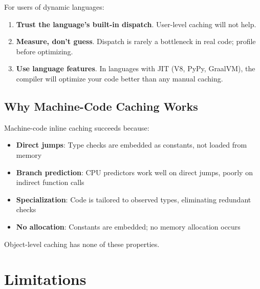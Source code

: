 \documentclass[sigplan,final]{acmart}
\begin{document}
For users of dynamic languages:

\begin{enumerate}
  \item \textbf{Trust the language's built-in dispatch}. User-level caching will not help.

  \item \textbf{Measure, don't guess}. Dispatch is rarely a bottleneck in real code; profile before
    optimizing.

  \item \textbf{Use language features}. In languages with JIT (V8, PyPy, GraalVM), the compiler
    will optimize your code better than any manual caching.
\end{enumerate}

\subsection{Why Machine-Code Caching Works}

Machine-code inline caching succeeds because:

\begin{itemize}
  \item \textbf{Direct jumps}: Type checks are embedded as constants, not loaded from memory
  \item \textbf{Branch prediction}: CPU predictors work well on direct jumps, poorly on indirect
    function calls
  \item \textbf{Specialization}: Code is tailored to observed types, eliminating redundant checks
  \item \textbf{No allocation}: Constants are embedded; no memory allocation occurs
\end{itemize}

Object-level caching has none of these properties.

\section{Limitations}
\end{document}
